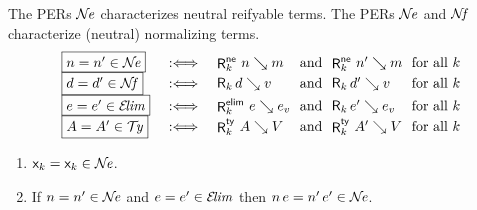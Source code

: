 \documentclass[acmlarge,review,anonymous]{acmart}\settopmatter{printfolios=true}
\begin{document}
The PERs $\mathcal{N}\!\mathit{e}$ characterizes neutral reifyable terms.
The PERs $\mathcal{N}\!\mathit{e}$ and $\mathcal{N}\!\mathit{f}$ characterize (neutral) normalizing terms.
\[
\begin{array}{l@{\quad}l@{\quad}l@{~}l@{~}l@{~}l@{~}l@{~}l}
  \fbox{$n = n' \in \NE$}
    & \defas &
    \RNe k n m &\mand& \RNe k {n'} {m} &\mforall k \\
  \fbox{$d = d' \in \NF$}
    & \defas &
    \R k d v &\mand& \R k {d'} {v} &\mforall k \\
  \fbox{$e = e' \in \ELIM$}
    & \defas &
    \RElim k e e_v &\mand& \R k {e'} {e_v} &\mforall k \\
  \fbox{$A = A' \in \TY$}
    & \defas &
    \RTy k A V &\mand& \RTy k {A'} {V} &\mforall k \\
\end{array}
\]

\begin{lemma}
  \label{lem:closne}
  \bla
  \begin{enumerate}
  \item $\mathsf{x}_{k} = \mathsf{x}_{k} \in \mathcal{N}\!\mathit{e}$.
  \item If $n = n' \in \mathcal{N}\!\mathit{e}$ and $e = e' \in \mathcal{E}\!\mathit{lim}$ then $n\,e = n'\,e' \in \mathcal{N}\!\mathit{e}$.
  \end{enumerate}
\end{lemma}
\end{document}
